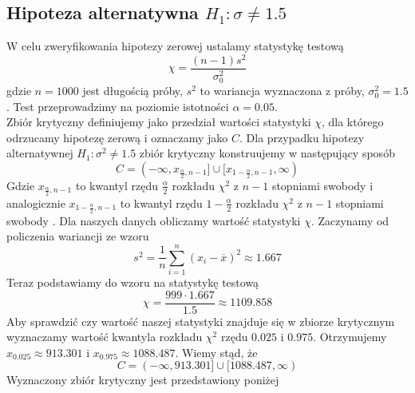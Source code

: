 \documentclass{article}
\begin{document}
\subsection{Hipoteza alternatywna $H_{1}:\sigma\neq1.5$}
W celu zweryfikowania hipotezy zerowej ustalamy statystykę testową
\begin{equation}
\chi = \frac{(n-1)s^{2}}{\sigma_{0}^{2}}
\end{equation}
gdzie $n=1000$ jest długością próby, $s^{2}$ to wariancja wyznaczona z próby, $\sigma_{0}^{2}=1.5$. Test przeprowadzimy na poziomie istotności $\alpha=0.05$.\\
Zbiór krytyczny definiujemy jako przedział wartości statystyki $\chi$, dla którego odrzucamy hipotezę zerową i oznaczamy jako $C$. Dla przypadku hipotezy alternatywnej $H_{1}:\sigma^{2}\neq1.5$ zbiór krytyczny konstruujemy w następujący sposób
\begin{equation}
C = (-\infty, x_{\frac{\alpha}{2},n-1}]\cup [x_{1-\frac{\alpha}{2},n-1}, \infty)
\end{equation}
Gdzie $x_{\frac{\alpha}{2},n-1}$ to kwantyl rzędu $\frac{\alpha}{2}$ rozkładu $\chi^{2}$ z $n-1$ stopniami swobody i analogicznie  $x_{1-\frac{\alpha}{2},n-1}$ to kwantyl rzędu $1-\frac{\alpha}{2}$ rozkładu $\chi^{2}$ z $n-1$ stopniami swobody .
Dla naszych danych obliczamy wartość statystyki $\chi$. Zaczynamy od policzenia wariancji ze wzoru
\begin{equation}
    s^{2}=\frac{1}{n}\sum^{n}_{i=1}(x_{i}-\overline{x})^{2}\approx1.667
\end{equation}
Teraz podstawiamy do wzoru na statystykę testową
\begin{equation}
    \chi=\frac{999\cdot1.667}{1.5}\approx1109.858
\end{equation}
Aby sprawdzić czy wartość naszej statystyki znajduje się w zbiorze krytycznym wyznaczamy wartość kwantyla rozkładu $\chi^{2}$ rzędu $0.025$ i $0.975$. Otrzymujemy $x_{0.025}\approx913.301$ i $x_{0.975}\approx1088.487$. Wiemy stąd, że 
\begin{equation}
C = (-\infty,913.301]\cup[1088.487,\infty)
\end{equation}
Wyznaczony zbiór krytyczny jest przedstawiony poniżej
\end{document}
